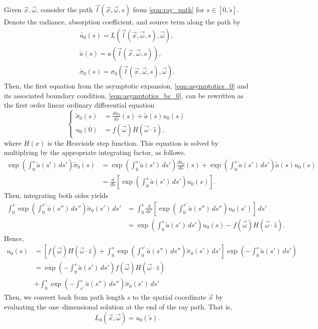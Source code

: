 Given $\vec{x}, \vec{\omega}$, consider the path $\vec{l}(\vec{x}, \vec{\omega}, s)$ from \eqref{eqn:ray_path} for $s \in [0, \tilde{s}]$.
Denote the radiance, absorption coefficient, and source term along the path by
\begin{align*}
  \tilde{u_0}(s) = L(\vec{l}(\vec{x}, \vec{\omega}, s), \vec{\omega}), \\
  \tilde{a}(s) = a(\vec{l}(\vec{x}, \vec{\omega}, s)), \\
  \tilde\sigma_0(s) = \sigma_0(\vec{l}(\vec{x}, \vec{\omega}, s), \vec{\omega}).
\end{align*}
Then, the first equation from the asymptotic expansion, \eqref{eqn:asymptotics_0} and its associated boundary condition, \eqref{eqn:asymptotics_bc_0}, can be rewritten as the first order linear ordinary differential equation
\begin{equation}
  \left\{
  \begin{aligned}
  \tilde\sigma_0(s) &= \frac{du_0}{ds}(s) + \tilde{a}(s) u_0(s) \\
  u_0(0) &= f(\vec{\omega})H(\vec{\omega}\cdot\hat{z}),
  \end{aligned}
  \right.
  \label{eqn:asymptotics_ode_0}
\end{equation}
where $H(x)$ is the Heaviside step function.
This equation is solved by multiplying by the appropriate integrating factor, as follows.
\begin{align*}
  \exp\left(\int_0^s \tilde{a}(s')\, ds'\right)\tilde\sigma_0(s) &= \exp\left(\int_0^s \tilde{a}(s')\, ds'\right) \frac{du_0}{ds}(s) + \exp\left(\int_0^s \tilde{a}(s')\, ds'\right) \tilde{a}(s) u_0(s) \\
  &= \frac{d}{ds}\left[\exp\left(\int_0^s \tilde{a}(s')\, ds'\right) u_0(s)\right].
\end{align*}
Then, integrating both sides yields
\begin{align*}
  \int_0^s \exp\left(\int_0^{s'} \tilde{a}(s'')\, ds''\right)\tilde\sigma_0(s')\, ds' &= \int_0^s \frac{d}{ds'}\left[\exp\left(\int_0^{s'} \tilde{a}(s'')\, ds''\right) u_0(s')\right]\, ds' \\
  &= \exp\left(\int_0^s \tilde{a}(s')\, ds'\right) u_0(s) - f(\vec{\omega})H(\vec{\omega}\cdot\hat{z}).
\end{align*}
Hence,
\begin{align}
  u_0(s) &= \left[f(\vec{\omega})H(\vec{\omega}\cdot\hat{z}) + \int_0^s \exp\left(\int_0^{s'} \tilde{a}(s'')\, ds''\right) \tilde\sigma_0(s')\, ds'\right] \exp\left(-\int_0^s \tilde{a}(s')\, ds'\right) \nonumber\\
  &= \exp\left(-\int_0^s \tilde{a}(s')\, ds'\right) f(\vec{\omega})H(\vec{\omega}\cdot\hat{z}) \nonumber\\
    &+ \int_0^s \exp\left(-\int_{s'}^s \tilde{a}(s'')\, ds''\right) \tilde\sigma_0(s')\, ds'
  \label{eqn:asymptotics_soln_0}
\end{align}
Then, we convert back from path length $s$ to the spatial coordinate $\vec{x}$ by evaluating the one--dimensional solution at the end of the ray path.
That is,
\begin{equation*}
  L_0(\vec{x}, \vec{\omega}) = u_0(\tilde{s}).
\end{equation*}

